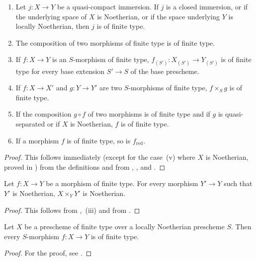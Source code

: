 \begin{proposition}[1.5.4]
\label{IV.1.5.4}
\begin{enumerate}
  \item[\rm(i)] Let $j:X\to Y$ be a quasi-compact immersion.
  If $j$ is a closed immersion, or if the underlying space of $X$ is Noetherian, or if the space underlying $Y$ is locally Noetherian, then $j$ is of finite type.
  \item[\rm(ii)] The composition of two morphisms of finite type is of finite type.
  \item[\rm(iii)] If $f:X\to Y$ is an $S$-morphism of finite type, $f_{(S')}:X_{(S')}\to Y_{(S')}$ is of finite type for every base extension $S'\to S$ of the base prescheme.
  \item[\rm(iv)] If $f:X\to X'$ and $g:Y\to Y'$ are two $S$-morphisms of finite type, $f\times_S g$ is of finite type.
  \item[\rm(v)] If the composition $g\circ f$ of two morphisms is of finite type and if $g$ is quasi-separated or if $X$ is Noetherian, $f$ is of finite type.
  \item[\rm(vi)] If a morphism $f$ is of finite type, so is $f_{\mathrm{red}}$.
\end{enumerate}
\end{proposition}

\begin{proof}
This follows immediately (except for the case~(v) where $X$ is Noetherian, proved in ) from the definitions and from , , and .
\end{proof}

\begin{corollary}[1.5.5]
\label{IV.1.5.5}
Let $f:X\to Y$ be a morphism of finite type.
For every morphism $Y'\to Y$ such that $Y'$ is Noetherian, $X\times_Y Y'$ is Noetherian.
\end{corollary}

\begin{proof}
This follows from ,~(iii) and from .
\end{proof}

\begin{corollary}[1.5.6]
\label{IV.1.5.6}
Let $X$ be a prescheme of finite type over a locally Noetherian prescheme $S$.
Then every $S$-morphism $f:X\to Y$ is of finite type.
\end{corollary}

\begin{proof}
For the proof, see .
\end{proof}

